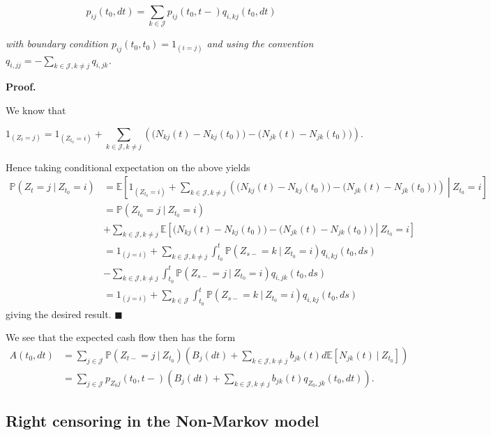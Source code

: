 \documentclass[a4paper,10pt,openany]{book}
\begin{document}
\[
p_{ij}(t_0,dt)=\sum_{k\in\mathcal J}p_{ij}(t_0,t-)q_{i,kj}(t_0,dt)
\]

\emph{with boundary condition \(p_{ij}(t_0,t_0)=1_{(i=j)}\) and using the convention \(q_{i,jj}=-\sum_{k\in\mathcal J,k\ne j}q_{i,jk}\).}

\textbf{Proof.}

We know that

\[
1_{(Z_{t}=j)}=1_{(Z_{t_0}=i)}+\sum_{k\in\mathcal J, k\ne j}\left(\Big(N_{kj}(t)-N_{kj}(t_0)\Big)-\Big(N_{jk}(t)-N_{jk}(t_0)\Big)\right).
\]

Hence taking conditional expectation on the above yields
\begin{align*}
\mathbb P(Z_t = j\ \vert\ Z_{t_0}=i)&=\mathbb E\left[\left.1_{(Z_{t_0}=i)}+\sum_{k\in\mathcal J, k\ne j}\left(\Big(N_{kj}(t)-N_{kj}(t_0)\Big)-\Big(N_{jk}(t)-N_{jk}(t_0)\Big)\right)\ \right\vert\ Z_{t_0}=i\right]\\
&=\mathbb P(Z_{t_0} = j\ \vert\ Z_{t_0}=i)\\
&+\sum_{k\in\mathcal J, k\ne j}\mathbb E\left[\left.\Big(N_{kj}(t)-N_{kj}(t_0)\Big)-\Big(N_{jk}(t)-N_{jk}(t_0)\Big)\ \right\vert\ Z_{t_0}=i\right]\\
&=1_{(j= i)}+\sum_{k\in\mathcal J, k\ne j}\int_{t_0}^t \mathbb P(Z_{s-}=k\ \vert\ Z_{t_0}=i)q_{i,kj}(t_0,ds)\\
&-\sum_{k\in\mathcal J, k\ne j}\int_{t_0}^t \mathbb P(Z_{s-}=j\ \vert\ Z_{t_0}=i)q_{i,jk}(t_0,ds)\\
&=1_{(j= i)} +\sum_{k\in\mathcal J}\int_{t_0}^t \mathbb P(Z_{s-}=k\ \vert\ Z_{t_0}=i)q_{i,kj}(t_0,ds)
\end{align*}
giving the desired result. \(\blacksquare\)

We see that the expected cash flow then has the form
\begin{align*}
A(t_0,dt)&=\sum_{j\in\mathcal J} \mathbb P(Z_{t-}= j\ \vert\ Z_{t_0})\left(B_j(dt)+\sum_{k\in\mathcal J,k\ne j}b_{jk}(t) d\mathbb E[N_{jk}(t)\ \vert\ Z_{t_0}]\right)\\
&=\sum_{j\in\mathcal J} p_{Z_0 j}(t_0,t-)\left(B_j(dt)+\sum_{k\in\mathcal J,k\ne j}b_{jk}(t) q_{Z_0,jk}(t_0,dt)\right).
\end{align*}

\hypertarget{right-censoring-in-the-non-markov-model}{%
\subsection{Right censoring in the Non-Markov model}\label{right-censoring-in-the-non-markov-model}}
\end{document}
